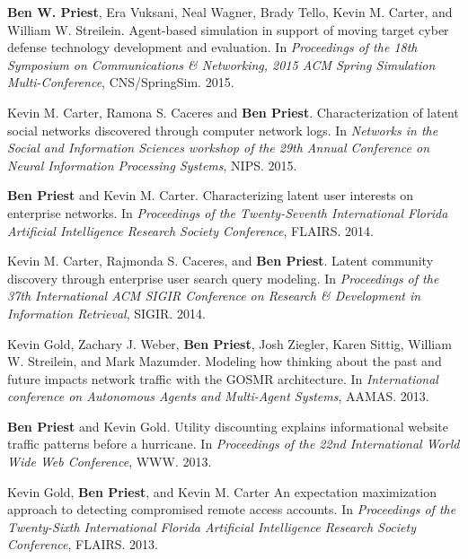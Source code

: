 \item \textbf{Ben W. Priest}, Era Vuksani, Neal Wagner, Brady Tello, Kevin M. Carter, and William W. Streilein. 
	Agent-based simulation in support of moving target cyber defense technology development and evaluation.
	In \emph{Proceedings of the 18th Symposium on Communications \& Networking, 2015 ACM Spring Simulation Multi-Conference}, 
	CNS/SpringSim. 
	2015.

\item Kevin M. Carter, Ramona S. Caceres and \textbf{Ben Priest}.
	Characterization of latent social networks discovered through computer network logs.
	In \emph{Networks in the Social and Information Sciences workshop of the 29th Annual Conference on Neural Information Processing Systems},
	NIPS.
	2015.

\item \textbf{Ben Priest} and Kevin M. Carter.
	Characterizing latent user interests on enterprise networks.
	In \emph{Proceedings of the Twenty-Seventh International Florida Artificial Intelligence Research Society Conference}, 
	FLAIRS. 
	2014.

\item Kevin M. Carter, Rajmonda S. Caceres, and \textbf{Ben Priest}.
	Latent community discovery through enterprise user search query modeling.
	In \emph{Proceedings of the 37th International ACM SIGIR Conference on Research \& Development in Information Retrieval}, 
	SIGIR. 
	2014.

\item Kevin Gold, Zachary J. Weber, \textbf{Ben Priest}, Josh Ziegler, Karen Sittig, William W. Streilein, and Mark Mazumder.
	Modeling how thinking about the past and future impacts network traffic with the GOSMR architecture.
	In \emph{International conference on Autonomous Agents and Multi-Agent Systems}, 
	AAMAS. 
	2013.

\item \textbf{Ben Priest} and Kevin Gold.
	Utility discounting explains informational website traffic patterns before a hurricane.
	In \emph{Proceedings of the 22nd International World Wide Web Conference}, 
	WWW. 
	2013.

\item Kevin Gold, \textbf{Ben Priest}, and Kevin M. Carter
	An expectation maximization approach to detecting compromised remote access accounts.
	In \emph{Proceedings of the Twenty-Sixth International Florida Artificial Intelligence Research Society Conference}, 
	FLAIRS. 
	2013.